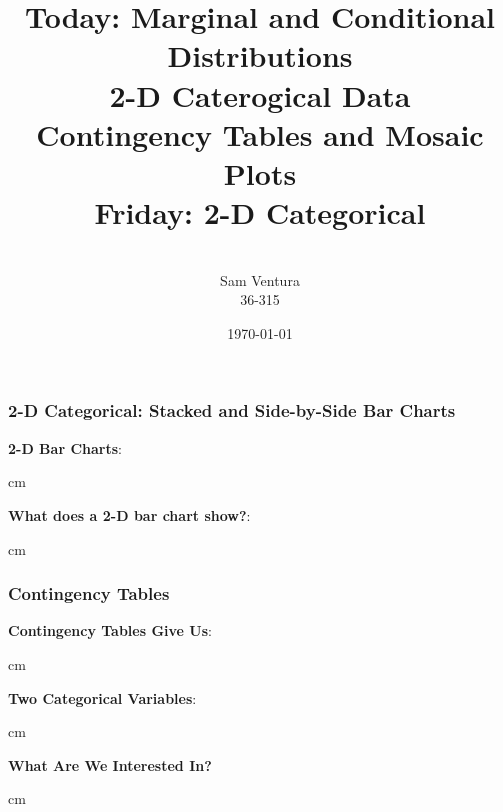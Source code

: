 \documentclass{beamer} %
\begin{document}
\title[dedup]{Today:  Marginal and Conditional Distributions \\ 2-D Caterogical Data \\ Contingency Tables and Mosaic Plots \\ Friday:  2-D Categorical}


\author[Samuel L. Ventura]{\\
  \large{Sam Ventura\\36-315}}
\date{\today}


\begin{frame}
	\maketitle
	
\end{frame}




\begin{frame}\frametitle{2-D Categorical: Stacked and Side-by-Side Bar Charts}
	\small
	
	\textbf{2-D Bar Charts}:  %
	
	 cm
	
	\textbf{What does a 2-D bar chart show?}:  %
	
	
	
	 cm
	
\end{frame}





\begin{frame}\frametitle{Contingency Tables}
	\small
	
	\textbf{Contingency Tables Give Us}:  %
	
	 cm
	
	\textbf{Two Categorical Variables}:  %
	
	 cm
	
	\textbf{What Are We Interested In?}  %
	
	
	
	
	
	 cm
	
\end{frame}
\end{document}
